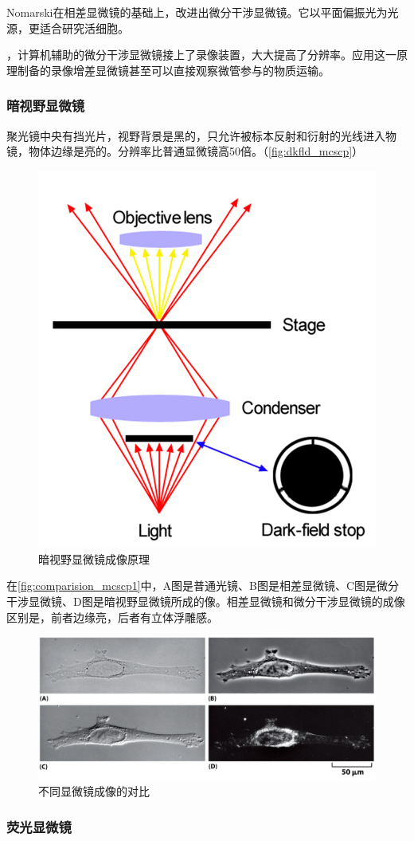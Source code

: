 Nomarski在相差显微镜的基础上，改进出微分干涉显微镜。它以平面偏振光为光源，更适合研究活细胞。

，计算机辅助的微分干涉显微镜接上了录像装置，大大提高了分辨率。应用这一原理制备的录像增差显微镜甚至可以直接观察微管参与的物质运输。

\subsubsection{暗视野显微镜}

聚光镜中央有挡光片，视野背景是黑的，只允许被标本反射和衍射的光线进入物镜，物体边缘是亮的。分辨率比普通显微镜高50倍。（\autoref{fig:dkfld_mcscp}）

\begin{figure}[htbp]
	\centering
	\includegraphics[width=0.4\linewidth]{Pics/暗视野显微镜}
	\caption{暗视野显微镜成像原理}
	\label{fig:dkfld_mcscp}
\end{figure}

在\autoref{fig:comparision_mcscp1}中，A图是普通光镜、B图是相差显微镜、C图是微分干涉显微镜、D图是暗视野显微镜所成的像。相差显微镜和微分干涉显微镜的成像区别是，前者边缘亮，后者有立体浮雕感。

\begin{figure}[htbp]
	\centering
	\includegraphics[width=0.8\linewidth]{Pics/显微镜成像对比}
	\caption{不同显微镜成像的对比}
	\label{fig:comparision_mcscp1}
\end{figure}

\subsubsection{荧光显微镜}

